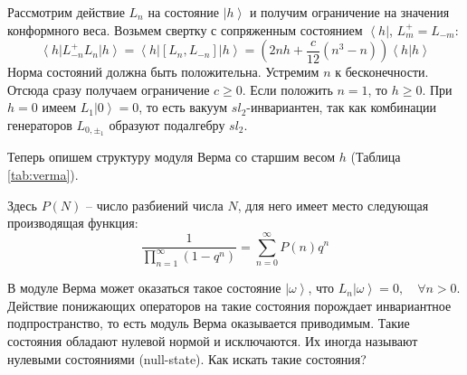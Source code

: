 \documentclass[a4paper,12pt]{article}
\theoremstyle{definition}
\theoremstyle{definition}
\theoremstyle{definition}
\begin{document}
Рассмотрим действие $L_{n}$ на состояние $\left|h\right>$ и получим ограничение на значения конформного веса. Возьмем свертку с сопряженным состоянием $\left<h\right|$, $L^{+}_{m}=L_{-m}$:
\begin{equation}
  \label{eq:308}
  \left<h\right|L^{+}_{-n}L_{n}\left|h\right>=\left<h\right| [L_{n},L_{-n}]\left|h\right> = \left(2nh +\frac{c}{12}(n^{3}-n)\right) \left<h|h\right>
\end{equation}
Норма состояний должна быть положительна. Устремим $n$ к бесконечности. Отсюда сразу получаем ограничение $c\geq 0$. Если положить $n=1$, то $h\geq 0$. При $h=0$ имеем $L_{1}\left|0\right>=0$, то есть вакуум $sl_{2}$-инвариантен, так как комбинации генераторов $L_{0,\pm_{1}}$ образуют подалгебру $sl_{2}$.

Теперь опишем структуру модуля Верма со старшим весом $h$ (Таблица \ref{tab:verma}).

\begin{table}[tbh]
\label{tab:verma} \noindent {}
\caption{Структура модуля Верма}
\end{table}

Здесь $P(N)$ -- число разбиений числа $N$, для него имеет место следующая производящая функция:
\begin{equation}
  \label{eq:309}
  \frac{1}{\prod_{n=1}^{\infty} (1-q^{n})} = \sum_{n=0}^{\infty} P(n) q^{n}
\end{equation}

В модуле Верма может оказаться такое состояние $\left|\omega\right>$, что $L_{n}\left|\omega\right>=0, \quad \forall n>0$. Действие понижающих операторов на такие состояния порождает инвариантное подпространство, то есть модуль Верма оказывается приводимым. Такие состояния обладают нулевой нормой и исключаются. Их иногда называют нулевыми состояниями (null-state).  Как искать такие состояния?
\end{document}
